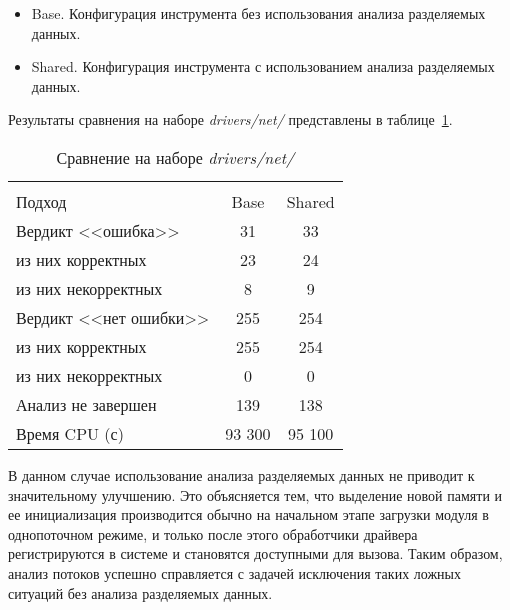 \begin{itemize}
\item Base. Конфигурация инструмента без использования анализа разделяемых данных.
\item Shared. Конфигурация инструмента с использованием анализа разделяемых данных.
\end{itemize}

Результаты сравнения на наборе \textit{drivers/net/} представлены в таблице~\ref{table-drivers-shared}.

  \begin{table}[h]\footnotesize \centering
    \caption{Сравнение на наборе \textit{drivers/net/}}
  	\label{table-drivers-shared}
    \begin{tabular}{ | l | c | c |}
      \hline
      		& 		\multicolumn{2}{c|}{\combatmode}  \\
      Подход         				& Base 	& Shared 	\\ \hline
      Вердикт <<ошибка>> 				& 31   	& 33    	\\ 
  \hspace{0.5cm} из них корректных 	& 23 	& 24 		\\ 
  \hspace{0.5cm} из них некорректных & 8 	& 9 		\\ \hline
      Вердикт <<нет ошибки>>  		& 255   & 254    	\\ 
  \hspace{0.5cm} из них корректных 	& 255 	& 254    	\\
  \hspace{0.5cm} из них некорректных & 0 	& 0    		\\ \hline
      Анализ не завершен       		& 139    & 138     	\\ \hline
      Время CPU (с)   				& 93 300 & 95 100  	\\ 
      \hline
    \end{tabular}
  \end{table}

В данном случае использование анализа разделяемых данных не приводит к значительному улучшению.
Это объясняется тем, что выделение новой памяти и ее инициализация производится обычно на начальном этапе загрузки модуля в однопоточном режиме, и только после этого обработчики драйвера регистрируются в системе и становятся доступными для вызова. 
Таким образом, анализ потоков успешно справляется с задачей исключения таких ложных ситуаций без анализа разделяемых данных.

